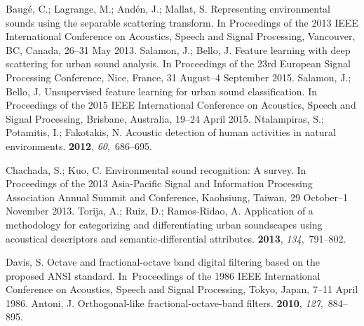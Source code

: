 \documentclass[sensors,article,accept,moreauthors,pdftex,10pt,a4paper]{mdpi}
\begin{document}
\begin{thebibliography}{999}
Baugé, C.; Lagrange, M.; Andén, J.; Mallat, S.
\newblock Representing environmental sounds using the separable scattering
  transform.
\newblock  In Proceedings of the 2013 IEEE International Conference on Acoustics, Speech and Signal
  Processing, {Vancouver, BC, Canada,  26--31 May } 2013.
Salamon, J.; Bello, J.
\newblock Feature learning with deep scattering for urban sound analysis.
\newblock  In  Proceedings of the 23rd European Signal Processing Conference,  {Nice, France, 31 August--4 September }2015.
Salamon, J.; Bello, J.
\newblock Unsupervised feature learning for urban sound classification.
\newblock In Proceedings of the 2015 IEEE International Conference on Acoustics, Speech and Signal
  Processing, {Brisbane,  Australia, 19--24 April } 2015.
Ntalampiras, S.; Potamitis, I.; Fakotakis, N.
\newblock Acoustic detection of human activities in natural environments.
 {\bf 2012}, {\em 60},~686--695.

Chachada, S.; Kuo, C.
\newblock Environmental sound recognition: A survey.
\newblock  In Proceedings of the 2013 Asia-Pacific Signal and Information Processing Association
  Annual Summit and Conference, {Kaohsiung, Taiwan, 29 October--1 November} 2013.
Torija, A.; Ruiz, D.; Ramos-Ridao, A.
\newblock Application of a methodology for categorizing and differentiating
  urban soundscapes using acoustical descriptors and semantic-differential
  attributes.
 {\bf 2013}, {\em 134},~791--802.

Davis, S.
\newblock Octave and fractional-octave band digital filtering based on the
  proposed ANSI standard.
\newblock  In~Proceedings of the 1986 IEEE International Conference on Acoustics, Speech and Signal
  Processing, {Tokyo, Japan, 7--11 April } 1986.
Antoni, J.
\newblock Orthogonal-like fractional-octave-band filters.
 {\bf 2010}, {\em 127},~884--895.


\end{thebibliography}
\end{document}
